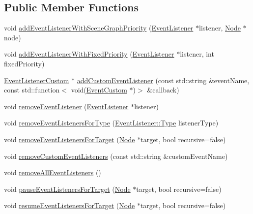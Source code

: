 \subsection*{Public Member Functions}
\begin{DoxyCompactItemize}
\item 
void \hyperlink{classEventDispatcher_a90b97ea5ad9bff4d684ca5bb6d5618bc}{add\+Event\+Listener\+With\+Scene\+Graph\+Priority} (\hyperlink{classEventListener}{Event\+Listener} $\ast$listener, \hyperlink{classNode}{Node} $\ast$node)
\item 
void \hyperlink{classEventDispatcher_a8a874f85b82c33d52a654289d6146bfb}{add\+Event\+Listener\+With\+Fixed\+Priority} (\hyperlink{classEventListener}{Event\+Listener} $\ast$listener, int fixed\+Priority)
\item 
\hyperlink{classEventListenerCustom}{Event\+Listener\+Custom} $\ast$ \hyperlink{classEventDispatcher_a34c423b6f80a3563bb9399f52b0479b5}{add\+Custom\+Event\+Listener} (const std\+::string \&event\+Name, const std\+::function$<$ void(\hyperlink{classEventCustom}{Event\+Custom} $\ast$)$>$ \&callback)
\item 
void \hyperlink{classEventDispatcher_a482553aa81d004ba84ad2f7fc1a99408}{remove\+Event\+Listener} (\hyperlink{classEventListener}{Event\+Listener} $\ast$listener)
\item 
void \hyperlink{classEventDispatcher_ad021a18c05461b34ab2a11ad2cdb268d}{remove\+Event\+Listeners\+For\+Type} (\hyperlink{classEventListener_ab78e6acdfa2343490eda9e92d1555ee4}{Event\+Listener\+::\+Type} listener\+Type)
\item 
void \hyperlink{classEventDispatcher_a64446315eca1c938c541d35d35d1a2a4}{remove\+Event\+Listeners\+For\+Target} (\hyperlink{classNode}{Node} $\ast$target, bool recursive=false)
\item 
void \hyperlink{classEventDispatcher_a255daae22df2d99e4209a43c3473f409}{remove\+Custom\+Event\+Listeners} (const std\+::string \&custom\+Event\+Name)
\item 
void \hyperlink{classEventDispatcher_aa7bba43c3e78f0957937d985fe13e0fe}{remove\+All\+Event\+Listeners} ()
\item 
void \hyperlink{classEventDispatcher_a33dbf3057a30a92f741fd1465b70363f}{pause\+Event\+Listeners\+For\+Target} (\hyperlink{classNode}{Node} $\ast$target, bool recursive=false)
\item 
void \hyperlink{classEventDispatcher_af38aed6f3a7890dc03f214dbaf49faf6}{resume\+Event\+Listeners\+For\+Target} (\hyperlink{classNode}{Node} $\ast$target, bool recursive=false)

\end{DoxyCompactItemize}
